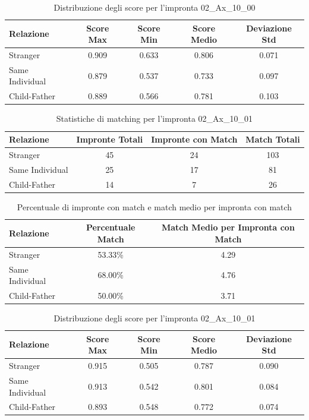 \begin{table}[htbp]
\centering
\caption{Distribuzione degli score per l'impronta 02\_Ax\_10\_00}
\label{tab:scores_02_Ax_10_00}
\begin{tabular}{|l|c|c|c|c|}
\hline
\textbf{Relazione} & \textbf{Score Max} & \textbf{Score Min} & \textbf{Score Medio} & \textbf{Deviazione Std} \\
\hline
Stranger & 0.909 & 0.633 & 0.806 & 0.071 \\
\hline
Same Individual & 0.879 & 0.537 & 0.733 & 0.097 \\
\hline
Child-Father & 0.889 & 0.566 & 0.781 & 0.103 \\
\hline
\end{tabular}
\end{table}


\begin{table}[htbp]
\centering
\caption{Statistiche di matching per l'impronta 02\_Ax\_10\_01}
\label{tab:results_02_Ax_10_01}
\begin{tabular}{|l|c|c|c|}
\hline
\textbf{Relazione} & \textbf{Impronte Totali} & \textbf{Impronte con Match} & \textbf{Match Totali} \\
\hline
Stranger & 45 & 24 & 103 \\
\hline
Same Individual & 25 & 17 & 81 \\
\hline
Child-Father & 14 & 7 & 26 \\
\hline
\end{tabular}
\end{table}


\begin{table}[htbp]
\centering
\caption{Percentuale di impronte con match e match medio per impronta con match}
\label{tab:match_percentage_02_Ax_10_01}
\begin{tabular}{|l|c|c|}
\hline
\textbf{Relazione} & \textbf{Percentuale Match} & \textbf{Match Medio per Impronta con Match} \\
\hline
Stranger & 53.33\% & 4.29 \\
\hline
Same Individual & 68.00\% & 4.76 \\
\hline
Child-Father & 50.00\% & 3.71 \\
\hline
\end{tabular}
\end{table}


\begin{table}[htbp]
\centering
\caption{Distribuzione degli score per l'impronta 02\_Ax\_10\_01}
\label{tab:scores_02_Ax_10_01}
\begin{tabular}{|l|c|c|c|c|}
\hline
\textbf{Relazione} & \textbf{Score Max} & \textbf{Score Min} & \textbf{Score Medio} & \textbf{Deviazione Std} \\
\hline
Stranger & 0.915 & 0.505 & 0.787 & 0.090 \\
\hline
Same Individual & 0.913 & 0.542 & 0.801 & 0.084 \\
\hline
Child-Father & 0.893 & 0.548 & 0.772 & 0.074 \\
\hline
\end{tabular}
\end{table}


